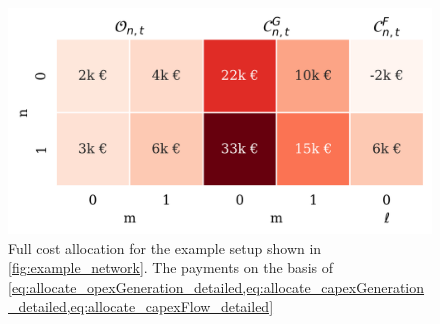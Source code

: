 \documentclass[11pt,twocolumn]{article}
\begin{document}
\begin{figure}[h]
\centering
 \includegraphics[width=\linewidth]{example_payoff_constraint_capacity.png}
 \caption{Full cost allocation for the example setup shown in \cref{fig:example_network}. The payments on the basis of \cref{eq:allocate_opexGeneration_detailed,eq:allocate_capexGeneration_detailed,eq:allocate_capexFlow_detailed}}
 \label{fig:example_payoff}
\end{figure}
\end{document}
